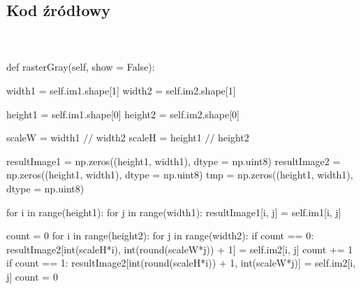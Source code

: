 \documentclass[final,a4paper,openany,12pt]{mwbk}
\begin{document}
\subsection*{Kod źródłowy}
\hfill
\\\\
\noindent def rasterGray(self, show = False):

width1 = self.im1.shape[1] \newline
\indent width2 = self.im2.shape[1] \newline

\indent height1 = self.im1.shape[0] \newline
\indent height2 = self.im2.shape[0] \newline

\indent scaleW = width1 $//$ width2 \newline
\indent scaleH = height1 $//$ height2 \newline

resultImage1 = np.zeros((height1, width1), dtype = np.uint8) \newline
\indent resultImage2 = np.zeros((height1, width1), dtype = np.uint8) \newline
\indent tmp = np.zeros((height1, width1), dtype = np.uint8) \newline

for i in range(height1): \newline
\indent for j in range(width1): \newline
\indent resultImage1[i, j] = self.im1[i, j] \newline

count = 0 \newline
\indent for i in range(height2): \newline
\indent for j in range(width2): \newline
\indent if count == 0: \newline
\indent resultImage2[int(scaleH*i), int(round(scaleW*j)) + 1] = self.im2[i, j] \newline
\indent count += 1 \newline
\indent if count == 1: \newline
\indent resultImage2[int(round(scaleH*i)) + 1, int(scaleW*j)] = self.im2[i, j] \newline
\indent count = 0 \newline
\end{document}
